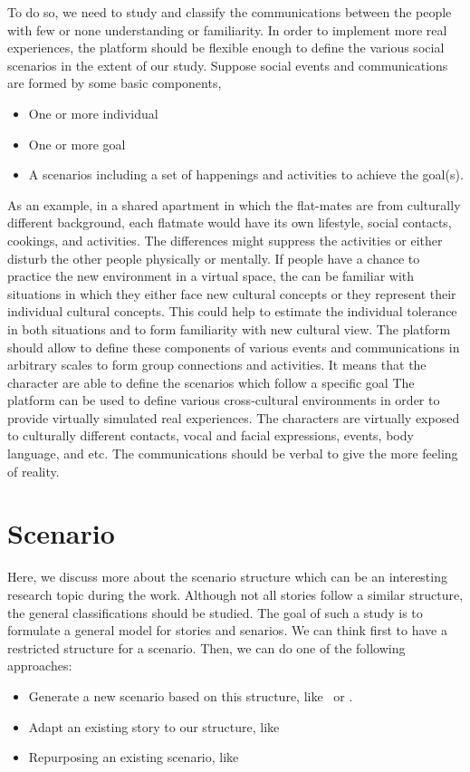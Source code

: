 \documentclass[conference]{IEEEtran}
\begin{document}
To do so, we need to study and classify the 
communications between the people with few or none understanding or familiarity. In order to implement 
more real experiences, the platform should be flexible enough to define the various social scenarios in the extent of our study.
Suppose social events and communications are formed by some basic components,
\begin{itemize}
\item One or more individual
\item One or more goal
\item A scenarios including a set of happenings and activities to achieve the goal(s).
\end{itemize}
As an example, in a shared apartment in which the flat-mates are from culturally different background, each flatmate would have its own lifestyle, social contacts, cookings, and activities. The differences might suppress the activities or either disturb the other people physically or mentally. If people have a chance to practice the new environment in a virtual space, the can be familiar with situations in which they either face new cultural concepts or they represent their individual cultural concepts. This could help to estimate the individual tolerance in both situations and to form familiarity with new cultural view. 
The platform should allow to define these components of various events and communications in 
arbitrary scales to form group connections and activities. It means that the character are able to define the scenarios which follow a specific goal
The platform can be used to define various cross-cultural environments in order to
provide virtually simulated real experiences. The characters are virtually exposed to culturally
different contacts, vocal and facial expressions, events, body language, and etc.
The communications should be verbal to give the more feeling of reality. 


\section{Scenario}
\cite{scenario}
Here, we discuss more about the scenario structure which can be
an interesting research topic during the work.
Although not all stories follow a similar structure,
the general classifications should be studied. The goal of such a study is to 
formulate a general model for stories and senarios.
We can think first to have a restricted structure for a scenario.
Then, we can do one of the following approaches: 
\begin{itemize}
\item Generate a new scenario based on this structure, like~\cite{scenario-gen} or \cite{l-system}.
\item Adapt an existing story to our structure, like~\cite{scenario-adapt}
\item Repurposing an existing scenario, like~\cite{scneario-repurposing}
\end{itemize}
\end{document}
